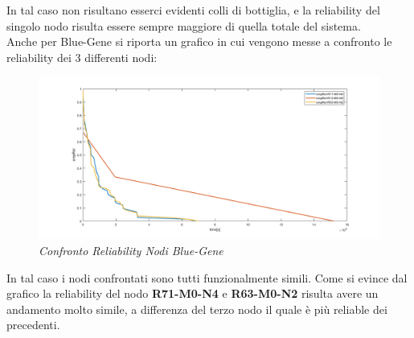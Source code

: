In tal caso non risultano esserci evidenti colli di bottiglia, e la reliability del singolo nodo risulta essere sempre maggiore di quella totale del sistema.
\\Anche per Blue-Gene si riporta un grafico in cui vengono messe a confronto le reliability dei 3 differenti nodi:
\begin{figure}[H]
	\centering
	\includegraphics[width=\textwidth]{img/hw6/confrontoBG.png}
	\caption{\textit{Confronto Reliability Nodi Blue-Gene}}
\end{figure}
In tal caso i nodi confrontati sono tutti funzionalmente simili. Come si evince dal grafico la reliability del nodo \textbf{R71-M0-N4} e \textbf{R63-M0-N2} risulta avere un andamento molto simile, a differenza del terzo nodo il quale è più reliable dei precedenti.
